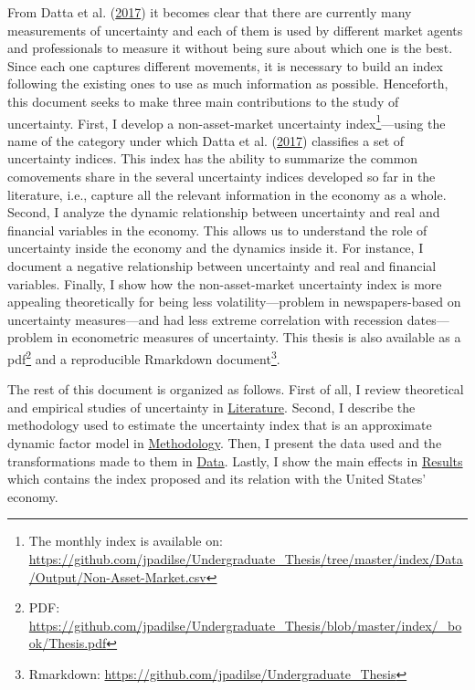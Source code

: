 \documentclass[12pt,twoside]{reedthesis}
\begin{document}
From Datta et al. (\protect\hyperlink{ref-dattetal:2017}{2017}) it becomes clear that there are currently many measurements of uncertainty and each of them is used by different market agents and professionals to measure it without being sure about which one is the best. Since each one captures different movements, it is necessary to build an index following the existing ones to use as much information as possible. Henceforth, this document seeks to make three main contributions to the study of uncertainty. First, I develop a non-asset-market uncertainty index\footnote{The monthly index is available on: \url{https://github.com/jpadilse/Undergraduate_Thesis/tree/master/index/Data/Output/Non-Asset-Market.csv}}---using the name of the category under which Datta et al. (\protect\hyperlink{ref-dattetal:2017}{2017}) classifies a set of uncertainty indices. This index has the ability to summarize the common comovements share in the several uncertainty indices developed so far in the literature, i.e., capture all the relevant information in the economy as a whole. Second, I analyze the dynamic relationship between uncertainty and real and financial variables in the economy. This allows us to understand the role of uncertainty inside the economy and the dynamics inside it. For instance, I document a negative relationship between uncertainty and real and financial variables. Finally, I show how the non-asset-market uncertainty index is more appealing theoretically for being less volatility---problem in newspapers-based on uncertainty measures---and had less extreme correlation with recession dates---problem in econometric measures of uncertainty. This thesis is also available as a pdf\footnote{PDF: \url{https://github.com/jpadilse/Undergraduate_Thesis/blob/master/index/_book/Thesis.pdf}} and a reproducible Rmarkdown document\footnote{Rmarkdown: \url{https://github.com/jpadilse/Undergraduate_Thesis}}.

The rest of this document is organized as follows. First of all, I review theoretical and empirical studies of uncertainty in \protect\hyperlink{literature}{Literature}. Second, I describe the methodology used to estimate the uncertainty index that is an approximate dynamic factor model in \protect\hyperlink{methodology}{Methodology}. Then, I present the data used and the transformations made to them in \protect\hyperlink{data}{Data}. Lastly, I show the main effects in \protect\hyperlink{results}{Results} which contains the index proposed and its relation with the United States' economy.
\end{document}
